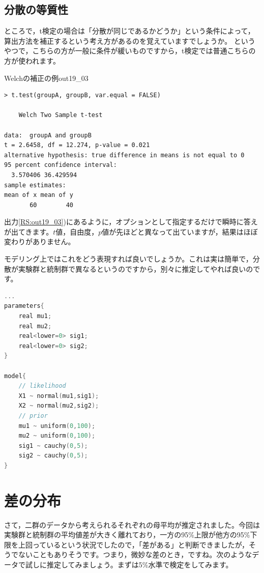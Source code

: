 \documentclass{ltjsbook}
\begin{document}
\subsection{分散の等質性}
ところで，t検定の場合は「分散が同じであるかどうか」という条件によって，算出方法を補正するという考え方があるのを覚えていますでしょうか。
というやつで，こちらの方が一般に条件が緩いものですから，t検定では普通こちらの方が使われます。
\begin{Rscreen}{Welchの補正の例}{out19_03}
    \begin{verbatim}
> t.test(groupA, groupB, var.equal = FALSE)

	Welch Two Sample t-test

data:  groupA and groupB
t = 2.6458, df = 12.274, p-value = 0.021
alternative hypothesis: true difference in means is not equal to 0
95 percent confidence interval:
  3.570406 36.429594
sample estimates:
mean of x mean of y 
       60        40 
    \end{verbatim}
\end{Rscreen}
出力\ref{RS:out19_03})にあるように，オプションとして指定するだけで瞬時に答えが出てきます。$t$値，自由度，$p$値が先ほどと異なって出ていますが，結果はほぼ変わりがありません。

モデリング上ではこれをどう表現すれば良いでしょうか。これは実は簡単で，分散が実験群と統制群で異なるというのですから，別々に推定してやれば良いのです。

\begin{lstlisting}[language=C++,label={code::19_03},caption={分散が異なる場合の推定モデル}]
        ...
parameters{
    real mu1;
    real mu2;
    real<lower=0> sig1;
    real<lower=0> sig2;
}

model{
    // likelihood
    X1 ~ normal(mu1,sig1);
    X2 ~ normal(mu2,sig2);
    // prior
    mu1 ~ uniform(0,100);
    mu2 ~ uniform(0,100);
    sig1 ~ cauchy(0,5);
    sig2 ~ cauchy(0,5);
}
\end{lstlisting}

\section{差の分布}
さて，二群のデータから考えられるそれぞれの母平均が推定されました。今回は実験群と統制群の平均値差が大きく離れており，一方の95\%上限が他方の95\%下限を上回っているという状況でしたので，「差がある」と判断できましたが，そうでないこともありそうです。つまり，微妙な差のとき，ですね。次のようなデータで試しに推定してみましょう。まずは5\%水準で検定をしてみます。
\end{document}
